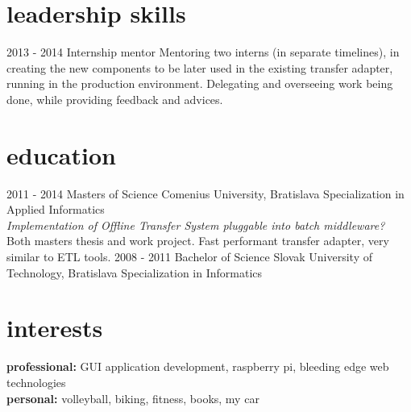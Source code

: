 \documentclass[]{friggeri-cv} %
\begin{document}


\section{leadership skills}

\begin{entrylist}
\entry
{2013 - 2014}
{Internship mentor}
{}
{Mentoring two interns (in separate timelines), in creating the new components to be later used in the existing transfer adapter, running in the production environment. Delegating and overseeing work being done, while providing feedback and advices.}

\end{entrylist}


\section{education}

\begin{entrylist}
\entry
{2011 - 2014}
{Masters {\normalfont of Science}}
{Comenius University, Bratislava}
{Specialization in Applied Informatics\\
\emph{Implementation of Offline Transfer System pluggable into batch middleware?}\\ 
Both masters thesis and work project. Fast performant transfer adapter, very similar to ETL tools.}
\entry
{2008 - 2011}
{Bachelor {\normalfont of Science}}
{Slovak University of Technology, Bratislava}
{Specialization in Informatics}
\end{entrylist}



\section{interests}

\textbf{professional:} GUI application development, raspberry pi, bleeding edge web technologies
\\
\textbf{personal:} volleyball, biking, fitness, books, my car

\end{document}
